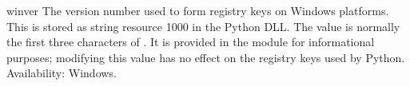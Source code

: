 \begin{datadesc}{winver}
The version number used to form registry keys on Windows platforms.
This is stored as string resource 1000 in the Python DLL.  The value
is normally the first three characters of .  It is
provided in the  module for informational purposes;
modifying this value has no effect on the registry keys used by
Python.
Availability: Windows.
\end{datadesc}
